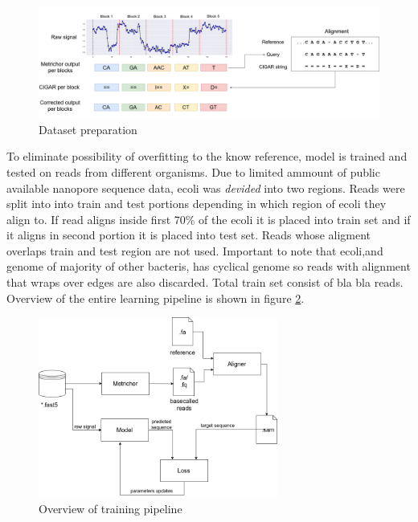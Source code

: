 \documentclass[times, utf8, diplomski, numeric, english]{fer}
\begin{document}
\begin{figure}[!ht]
	\begin{center}
		\includegraphics[width=1\textwidth]{./imgs/train_data_correction.png}
		\caption{Dataset preparation}
		\label{fg:data_correction}
	\end{center}
\end{figure}


To eliminate possibility of overfitting to the know reference, model is trained and tested on reads from different organisms. Due to limited ammount of public available nanopore sequence data, ecoli was \textit{devided} into two regions.
Reads were split into into train and test portions depending in which region of ecoli they align to. 
If read aligns inside first 70\% of the ecoli it is placed into train set and if it aligns in second portion it is placed into test set. Reads whose aligment overlaps train and test region are not used. Important to note that ecoli,and genome of majority of other bacteris, has cyclical genome so reads with alignment that wraps over edges are also discarded. Total train set consist of bla bla reads.
Overview of the entire learning pipeline is shown in figure \ref{fg:train_pipe}.
\begin{figure}[!ht]
	\begin{center}
		\includegraphics[width=0.7\textwidth]{./imgs/train_pipeline.png}
		\caption{Overview of training pipeline}
		\label{fg:train_pipe}
	\end{center}
\end{figure}
\end{document}
